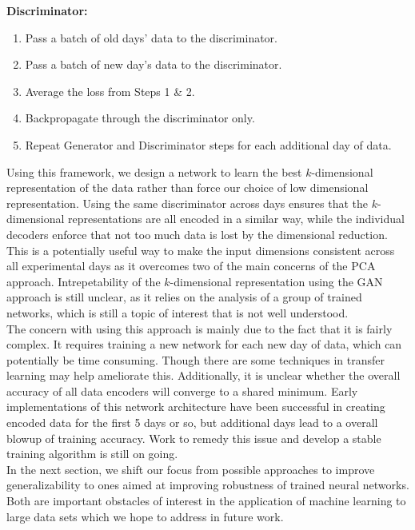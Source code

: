 \documentclass[12pt]{article}
\begin{document}
  \textbf{Discriminator:} \\
  \begin{enumerate}
    \item Pass a batch of old days' data to the discriminator.
    \item Pass a batch of new day's data to the discriminator.
    \item Average the loss from Steps 1 \& 2.
    \item Backpropagate through the discriminator only.
    \item Repeat Generator and Discriminator steps for each additional day of data.
  \end{enumerate}
\indent Using this framework, we design a network to learn the best $k$-dimensional representation of the data rather than force our choice of low dimensional representation. Using the same discriminator across days ensures that the $k$-dimensional representations are all encoded in a similar way, while the individual decoders enforce that not too much data is lost by the dimensional reduction. This is a potentially useful way to make the input dimensions consistent across all experimental days as it overcomes two of the main concerns of the PCA approach. Intrepetability of the $k$-dimensional representation using the GAN approach is still unclear, as it relies on the analysis of a group of trained networks, which is still a topic of interest that is not well understood. \\
The concern with using this approach is mainly due to the fact that it is fairly complex. It requires training a new network for each new day of data, which can potentially be time consuming. Though there are some techniques in transfer learning may help ameliorate this. Additionally, it is unclear whether the overall accuracy of all data encoders will converge to a shared minimum. Early implementations of this network architecture have been successful in creating encoded data for the first 5 days or so, but additional days lead to a overall blowup of training accuracy. Work to remedy this issue and develop a stable training algorithm is still on going. \\
\indent In the next section, we shift our focus from possible approaches to improve generalizability to ones aimed at improving robustness of trained neural networks. Both are important obstacles of interest in the application of machine learning to large data sets which we hope to address in future work.
\end{document}
